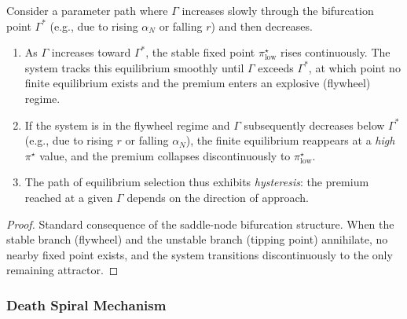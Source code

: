 \begin{proposition}
  \label{prop:hysteresis}
  Consider a parameter path where $\Gamma$ increases slowly through the
  bifurcation point $\Gamma^*$ (e.g., due to rising $\alpha_N$ or falling $r$)
  and then decreases.
  \begin{enumerate}
    \item As $\Gamma$ increases toward $\Gamma^*$, the stable fixed point
      $\pi^\star_{\mathrm{low}}$ rises continuously.  The system tracks
      this equilibrium smoothly until $\Gamma$ exceeds $\Gamma^*$, at
      which point no finite equilibrium exists and the premium enters an
      explosive (flywheel) regime.
    \item If the system is in the flywheel regime and $\Gamma$
      subsequently decreases below $\Gamma^*$ (e.g., due to rising $r$
      or falling $\alpha_N$), the finite equilibrium reappears at a
      \emph{high} $\pi^\star$ value, and the premium collapses
      discontinuously to $\pi^\star_{\mathrm{low}}$.
    \item The path of equilibrium selection thus exhibits \emph{hysteresis}:
      the premium reached at a given $\Gamma$ depends on the direction of
      approach.
  \end{enumerate}
\end{proposition}

\begin{proof}
  Standard consequence of the saddle-node bifurcation structure.  When the
  stable branch (flywheel) and the unstable branch (tipping point) annihilate,
  no nearby fixed point exists, and the system transitions discontinuously
  to the only remaining attractor.
\end{proof}

\subsubsection{Death Spiral Mechanism}
\label{sec:death_spiral}

